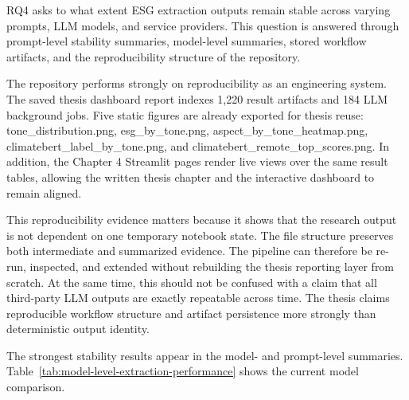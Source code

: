 RQ4 asks to what extent ESG extraction outputs remain stable across varying prompts, LLM models, and service providers. This question is answered through prompt-level stability summaries, model-level summaries, stored workflow artifacts, and the reproducibility structure of the repository.

The repository performs strongly on reproducibility as an engineering system. The saved thesis dashboard report indexes 1,220 result artifacts and 184 LLM background jobs. Five static figures are already exported for thesis reuse: tone\_distribution.png, esg\_by\_tone.png, aspect\_by\_tone\_heatmap.png, climatebert\_label\_by\_tone.png, and climatebert\_remote\_top\_scores.png. In addition, the Chapter 4 Streamlit pages render live views over the same result tables, allowing the written thesis chapter and the interactive dashboard to remain aligned.

This reproducibility evidence matters because it shows that the research output is not dependent on one temporary notebook state. The file structure preserves both intermediate and summarized evidence. The pipeline can therefore be re-run, inspected, and extended without rebuilding the thesis reporting layer from scratch. At the same time, this should not be confused with a claim that all third-party LLM outputs are exactly repeatable across time. The thesis claims reproducible workflow structure and artifact persistence more strongly than deterministic output identity.

The strongest stability results appear in the model- and prompt-level summaries. Table~\ref{tab:model-level-extraction-performance} shows the current model comparison.

